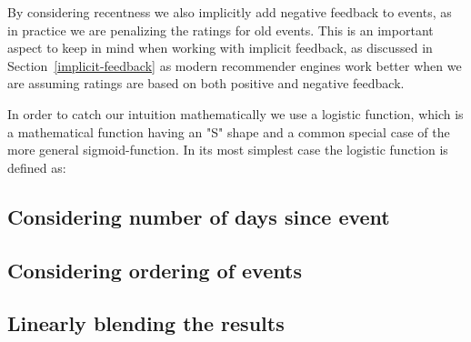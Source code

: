 By considering recentness we also implicitly add negative feedback to events,
as in practice we are penalizing the ratings for old events. This is an
important aspect to keep in mind when working with implicit feedback, as
discussed in Section~\ref{implicit-feedback} as modern recommender engines work
better when we are assuming ratings are based on both positive and negative
feedback.

In order to catch our intuition mathematically we use a logistic function, which
is a mathematical function having an "S" shape and a common special case of the
more general sigmoid-function. In its most simplest case the logistic function
is defined as:



\subsection{Considering number of days since event}

\subsection{Considering ordering of events}

\subsection{Linearly blending the results}
